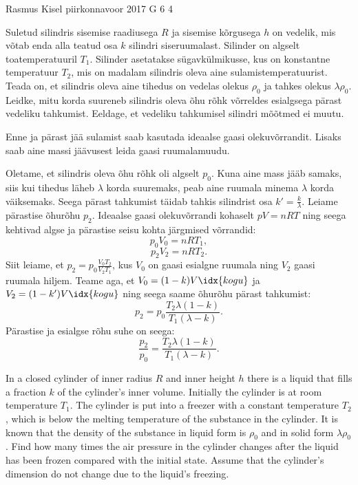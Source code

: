 {Rasmus Kisel} %
{piirkonnavoor} %
{2017} %
{G 6} %
{4} %
{
\ifStatement
Suletud silindris sisemise raadiusega $R$ ja sisemise kõrgusega $h$ on vedelik, mis võtab enda alla teatud osa $k$ silindri siseruumalast. Silinder on algselt toatemperatuuril $T_{1}$. Silinder asetatakse sügavkülmikusse, kus on konstantne temperatuur $T_{2}$, mis on madalam silindris oleva aine sulamistemperatuurist. Teada on, et silindris oleva aine tihedus on vedelas olekus $\rho_0$ ja tahkes olekus $\lambda\rho_0$. Leidke, mitu korda suureneb silindris oleva õhu rõhk võrreldes esialgsega pärast vedeliku tahkumist. Eeldage, et vedeliku tahkumisel silindri mõõtmed ei muutu.
\fi


\ifHint
Enne ja pärast jää sulamist saab kasutada ideaalse gaasi olekuvõrrandit. Lisaks saab aine massi jäävusest leida gaasi ruumalamuudu.
\fi


\ifSolution
Oletame, et silindris oleva õhu rõhk oli algselt $p_{0}$. Kuna aine mass jääb samaks, siis kui tihedus läheb $\lambda$ korda suuremaks, peab aine ruumala minema $\lambda$ korda väiksemaks. Seega pärast tahkumist täidab tahkis silindrist osa $k'=\frac{k}{\lambda}$. Leiame pärastise õhurõhu $p_{2}$. Ideaalse gaasi olekuvõrrandi kohaselt $pV=nRT$ ning seega kehtivad algse ja pärastise seisu kohta järgmised võrrandid:
\begin{equation*}
p_{0}V_{0}=nRT_{1},
\end{equation*}
\begin{equation*}
p_{2}V_{2}=nRT_{2}.
\end{equation*}
Siit leiame, et $p_{2}=p_{0}\frac{V_{0}T_{2}}{V_{2}T_{1}}$, kus $V_{0}$ on gaasi esialgne ruumala ning $V_{2}$ gaasi ruumala hiljem. Teame aga, et $V_{0}=(1-k)V\idx{kogu}$ ja $V_{2}=(1-k')V\idx{kogu}$ ning seega saame õhurõhu pärast tahkumist:
\begin{equation*}
p_{2}=p_{0}\frac{T_{2}\lambda (1-k)}{T_{1}(\lambda-k)}.
\end{equation*}
Pärastise ja esialgse rõhu suhe on seega:
\begin{equation*}
\frac{p_{2}}{p_{0}}=\frac{T_{2}\lambda(1-k)}{T_{1}(\lambda-k)}.
\end{equation*}
\fi


\ifEngStatement
In a closed cylinder of inner radius $R$ and inner height $h$ there is a liquid that fills a fraction $k$ of the cylinder's inner volume. Initially the cylinder is at room temperature $T_{1}$. The cylinder is put into a freezer with a constant temperature $T_{2}$, which is below the melting temperature of the substance in the cylinder. It is known that the density of the substance in liquid form is $\rho_0$ and in solid form $\lambda\rho_0$. Find how many times the air pressure in the cylinder changes after the liquid has been frozen compared with the initial state. Assume that the cylinder's dimension do not change due to the liquid’s freezing.
\fi


}
